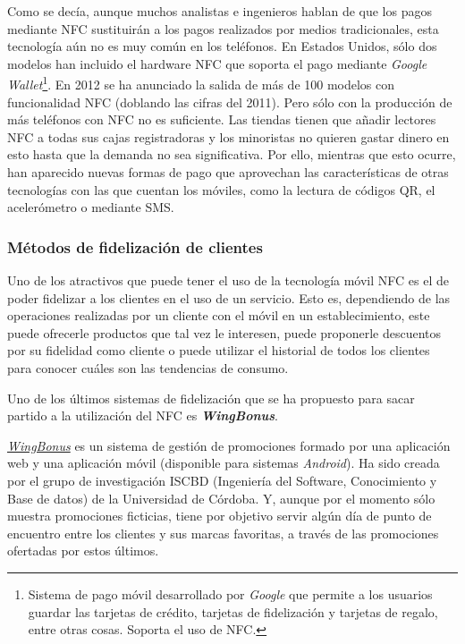   Como se decía, aunque muchos analistas e ingenieros hablan de que los 
  pagos mediante \acs{NFC} sustituirán a los pagos realizados por medios
  tradicionales, esta tecnología aún no es muy común en los teléfonos. En
  Estados Unidos, sólo dos modelos han incluido el hardware \acs{NFC}
  que soporta el pago mediante \emph{Google Wallet}\footnote{Sistema de pago 
  móvil desarrollado por \emph{Google} que permite a los usuarios guardar las 
  tarjetas de crédito, tarjetas de fidelización y tarjetas de regalo, entre 
  otras cosas. Soporta el uso de \acs{NFC}.}. En 2012 se ha anunciado
  la salida de más de 100 modelos con funcionalidad \acs{NFC} (doblando las 
  cifras del 2011). Pero sólo con la producción de más teléfonos con \acs{NFC} 
  no es suficiente. Las tiendas tienen que añadir lectores \acs{NFC} a todas
  sus cajas registradoras y los minoristas no quieren gastar dinero en esto
  hasta que la demanda no sea significativa. Por ello, mientras que esto 
  ocurre, han aparecido nuevas formas de pago que aprovechan las 
  características de otras tecnologías con las que cuentan los móviles, como 
  la lectura de códigos \acs{QR}, el acelerómetro o mediante
  \acs{SMS}\cite{bib:noWaiting}.

    \subsubsection{Métodos de fidelización de clientes}
  Uno de los atractivos que puede tener el uso de la tecnología móvil \acs{NFC}
  es el de poder fidelizar a los clientes en el uso de un servicio. Esto es,
  dependiendo de las operaciones realizadas por un cliente con el móvil en un
  establecimiento, este puede ofrecerle productos que tal vez le interesen,
  puede proponerle descuentos por su fidelidad como cliente o puede utilizar
  el historial de todos los clientes para conocer cuáles son las tendencias
  de consumo.
  
  Uno de los últimos sistemas de fidelización que se ha propuesto para sacar 
  partido a la utilización del \acs{NFC} es \emph{\textbf{WingBonus}}.

  \emph{\href{http://wingbonus.com/}{WingBonus}} es un sistema de
  gestión de promociones formado por una aplicación web y una aplicación móvil
  (disponible para sistemas \emph{Android}). Ha sido creada por el grupo de 
  investigación ISCBD (Ingeniería del Software, Conocimiento y Base de datos) 
  de la Universidad de Córdoba. Y, aunque por el momento sólo muestra 
  promociones ficticias, tiene por objetivo servir algún día de punto de 
  encuentro entre los clientes y sus marcas favoritas, a través de las 
  promociones ofertadas por estos últimos.
  
